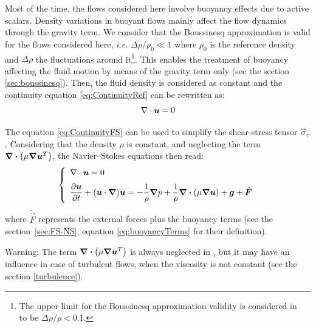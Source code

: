 Most of the time, the flows considered here involve buoyancy effects due to active scalars.
Density variations in buoyant flows mainly affect the flow dynamics through the gravity term.
We consider that the Boussinesq approximation is valid for the flows considered here, \textit{i.e.} $\Delta \rho/\rho_0 \ll 1$
where $\rho_0$ is the reference density and $\Delta\rho$ the fluctuations around
it\footnote{The upper limit for the Boussinesq approximation validity is considered in~\cite{Viollet1997} to be $\Delta \rho/\rho < 0.1$.}.
This enables the treatment of buoyancy affecting the fluid motion by means of the gravity term only
(see the section \ref{sec:boussinesq}).
Then, the fluid density is considered as constant and the continuity equation \eqref{eq:ContinuityRef} can be rewritten as:
\begin{equation}
  \nabla \cdot \bm{u} = 0
  \label{eq:ContinuityFS}
\end{equation}

The equation \eqref{eq:ContinuityFS} can be used to simplify the shear-stress tensor $\vec{\sigma}_\tau$.
Considering that the density $\rho$ is constant, and neglecting the term $\bm{\nabla \cdot} \left(\mu \bm{\nabla} \bm{u}^T\right)$,
the Navier--Stokes equations then read:
\begin{equation}\label{eq:NS_buoyant}
  \left\{
    \begin{array}{l}
      \Div \vec{u} = 0 \medskip \\
      \dfrac{\partial \vec{u} }{\partial t} + (\vec{u} \cdot \Grad) \vec{u} = -\dfrac{1}{\rho} \Grad p + \dfrac{1}{\rho} \vec{\Div} \left(\mu \Grad \vec{u}\right)+ \vec{g} + \tilde{\vec{F}}\\
    \end{array}
  \right.
\end{equation}
where $\tilde{\vec{F}}$ represents the external forces plus the buoyancy terms (see the section~\ref{sec:FS-NS},
equation \eqref{eq:buoyancyTerms} for their definition).

\begin{WarningBlock}{Warning:}
  The term $\bm{\nabla \cdot} \left(\mu \bm{\nabla} \bm{u}^T\right)$ is always neglected in , but it may have an
  influence in case of turbulent flows, when the viscosity is not constant (see the section \ref{turbulence}).
\end{WarningBlock}

%
%

